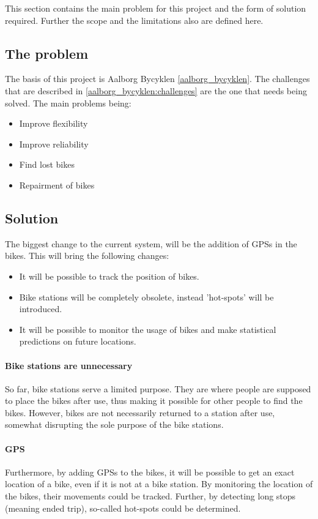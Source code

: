 This section contains the main problem for this project and the form of solution required.
Further the scope and the limitations also are defined here.
\subsection{The problem}
The basis of this project is Aalborg Bycyklen \cref{aalborg_bycyklen}.
The challenges that are described in \cref{aalborg_bycyklen:challenges} are the one that needs being solved.
The main problems being:
\begin{itemize}
\item Improve flexibility
\item Improve reliability
\item Find lost bikes
\item Repairment of bikes
\end{itemize}

\subsection{Solution}
The biggest change to the current system, will be the addition of GPSs in the bikes.
This will bring the following changes:
\begin{itemize}
\item It will be possible to track the position of bikes.
\item Bike stations will be completely obsolete,  instead 'hot-spots' will be introduced.
\item It will be possible to monitor the usage of bikes and make statistical predictions on future locations.
\end{itemize}

\paragraph{Bike stations are unnecessary}
So far, bike stations serve a limited purpose.
They are where people are supposed to place the bikes after use, thus making it possible for other people to find the bikes.
However, bikes are not necessarily returned to a station after use, somewhat disrupting the sole purpose of the bike stations.

\paragraph{GPS}
Furthermore, by adding GPSs to the bikes, it will be possible to get an exact location of a bike, even if it is not at a bike station.
By monitoring the location of the bikes, their movements could be tracked.
Further, by detecting long stops (meaning ended trip), so-called hot-spots could be determined.

